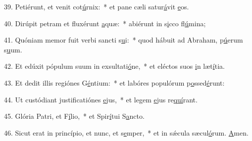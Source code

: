 39. Petiérunt, et venit cot\uline{ú}rnix:~* et pane cæli satur\uline{á}vit \uline{e}os.\par 
40. Dirúpit petram et fluxérunt \uline{a}quæ:~* abiérunt in s\uline{i}cco fl\uline{ú}mina;\par 
41. Quóniam memor fuit verbi sancti s\uline{u}i:~* quod hábuit ad Abraham, p\uline{ú}erum s\uline{u}um.\par 
42. Et edúxit pópulum suum in exsultati\uline{ó}ne,~* et eléctos suos \uline{i}n læt\uline{í}tia.\par 
43. Et dedit illis regiónes G\uline{é}ntium:~* et labóres populórum p\uline{o}ssed\uline{é}runt:\par 
44. Ut custódiant justificatiónes \uline{e}jus,~* et legem \uline{e}jus re\uline{quí}rant.\par 
45. Glória Patri, et F\uline{í}lio,~* et Spir\uline{í}tui S\uline{a}ncto.\par 
46. Sicut erat in princípio, et nunc, et s\uline{e}mper,~* et in sǽcula sæcul\uline{ó}rum. \uline{A}men.\par 
